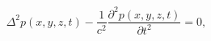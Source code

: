 \documentclass{article}
\begin{document}
\begin{sloppy}
\begin{equation}
  \label{eqn:wave_equation}
    \Delta^2p(x,y,z,t)-
    \displaystyle\frac{1}{c^2}\frac{\partial^2p(x,y,z,t)}{\partial t^2}=0,
\end{equation}





%
% 
%
%
%
% 
%
% 
% 


\end{sloppy}
\end{document}
